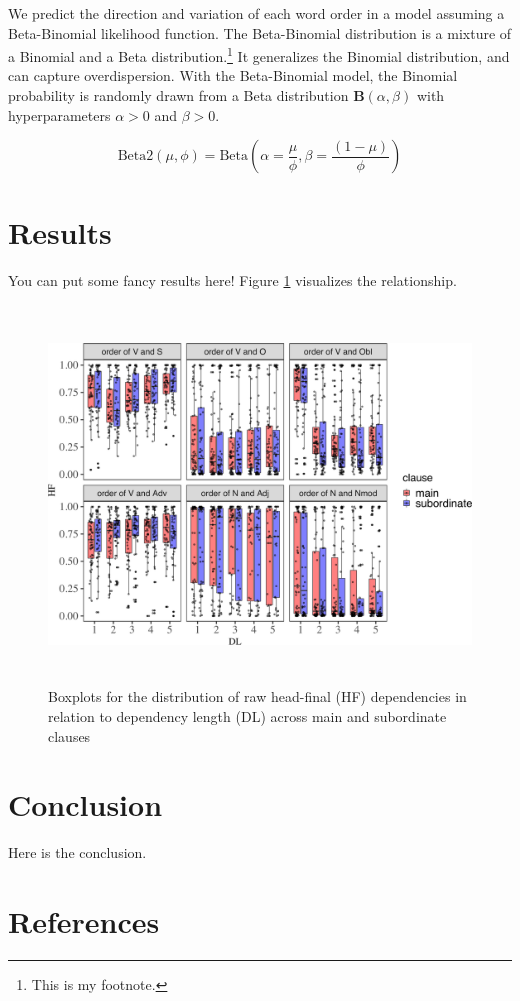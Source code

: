 \documentclass[10pt,a4paper,]{article}
\begin{document}
We predict the direction and variation of each word order in a model
assuming a Beta-Binomial likelihood function. The Beta-Binomial
distribution is a mixture of a Binomial and a Beta
distribution.\footnote{This is my footnote.} It generalizes the Binomial
distribution, and can capture overdispersion. With the Beta-Binomial
model, the Binomial probability is randomly drawn from a Beta
distribution \(\mathbf{B}\left(\alpha, \beta \right)\) with
hyperparameters \(\alpha > 0\) and \(\beta > 0\).

\begin{equation*}
\text{Beta2} \left(\mu, \phi \right) = \text{Beta} \left(\alpha = \frac{\mu}{\phi}, \beta = \frac{\left(1 - \mu \right)}{\phi} \right)
\end{equation*}

\hypertarget{results}{%
\section{Results}\label{results}}

You can put some fancy results here! Figure \ref{fig-raw-dist}
visualizes the relationship.

\captionsetup{margin=1cm}
\begin{figure}[htpb]
\centering
\includegraphics[width=14cm, height=10cm]{figures/relationship between DL and HF-1.pdf}
\caption{Boxplots for the distribution of raw head-final (HF) dependencies in relation to dependency length (DL) across main and subordinate clauses} 
\label{fig-raw-dist}
\end{figure}

\hypertarget{conclusion}{%
\section{Conclusion}\label{conclusion}}

Here is the conclusion. \setlength{\parskip}{0pt} \raggedright
{}


\hypertarget{references}{%
\section{References}\label{references}}

\end{document}
